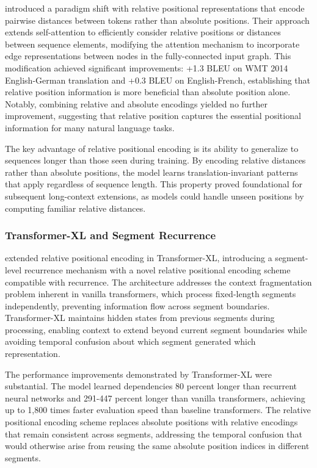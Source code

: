 \citet{shaw2018self} introduced a paradigm shift with relative positional representations that encode pairwise distances between tokens rather than absolute positions. Their approach extends self-attention to efficiently consider relative positions or distances between sequence elements, modifying the attention mechanism to incorporate edge representations between nodes in the fully-connected input graph. This modification achieved significant improvements: +1.3 BLEU on WMT 2014 English-German translation and +0.3 BLEU on English-French, establishing that relative position information is more beneficial than absolute position alone. Notably, combining relative and absolute encodings yielded no further improvement, suggesting that relative position captures the essential positional information for many natural language tasks.

The key advantage of relative positional encoding is its ability to generalize to sequences longer than those seen during training. By encoding relative distances rather than absolute positions, the model learns translation-invariant patterns that apply regardless of sequence length. This property proved foundational for subsequent long-context extensions, as models could handle unseen positions by computing familiar relative distances.

\subsubsection{Transformer-XL and Segment Recurrence}

\citet{dai2019transformerxl} extended relative positional encoding in Transformer-XL, introducing a segment-level recurrence mechanism with a novel relative positional encoding scheme compatible with recurrence. The architecture addresses the context fragmentation problem inherent in vanilla transformers, which process fixed-length segments independently, preventing information flow across segment boundaries. Transformer-XL maintains hidden states from previous segments during processing, enabling context to extend beyond current segment boundaries while avoiding temporal confusion about which segment generated which representation.

The performance improvements demonstrated by Transformer-XL were substantial. The model learned dependencies 80 percent longer than recurrent neural networks and 291-447 percent longer than vanilla transformers, achieving up to 1,800 times faster evaluation speed than baseline transformers. The relative positional encoding scheme replaces absolute positions with relative encodings that remain consistent across segments, addressing the temporal confusion that would otherwise arise from reusing the same absolute position indices in different segments.

